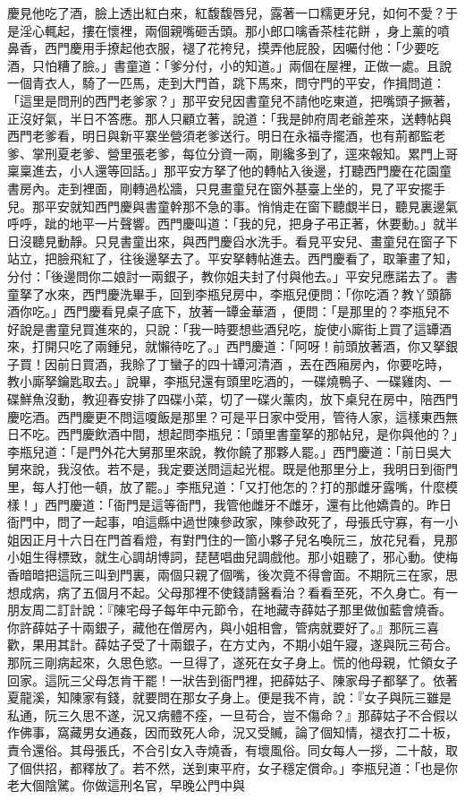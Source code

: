 慶見他吃了酒，臉上透出紅白來，紅馥馥唇兒，露著一口糯更牙兒，如何不愛？于是淫心輒起，摟在懷裡，兩個親嘴砸舌頭。那小郎口噙香茶桂花餅 ，身上薰的噴鼻香，西門慶用手撩起他衣服，褪了花袴兒，摸弄他屁股，因囑付他：「少要吃酒，只怕糟了臉。」書童道：「爹分付，小的知道。」兩個在屋裡，正做一處。且說一個青衣人，騎了一匹馬，走到大門首，跳下馬來，問守門的平安，作揖問道：「這里是問刑的西門老爹家？」那平安兒因書童兒不請他吃東道，把嘴頭子撅著，正沒好氣，半日不答應。那人只顧立著，說道：「我是帥府周老爺差來，送轉帖與西門老爹看，明日與新平寨坐營須老爹送行。明日在永福寺擺酒，也有荊都監老爹、掌刑夏老爹、營里張老爹，每位分資一兩，剛纔多到了，逕來報知。累門上哥稟稟進去，小人還等回話。」那平安方拏了他的轉帖入後邊，打聽西門慶在花園童書房內。走到裡面，剛轉過松牆，只見畫童兒在窗外基臺上坐的，見了平安擺手兒。那平安就知西門慶與書童幹那不急的事。悄悄走在窗下聽覷半日，聽見裏邊氣呼呼，跐的地平一片聲響。西門慶叫道：「我的兒，把身子弔正著，休要動。」就半日沒聽見動靜。只見書童出來，與西門慶舀水洗手。看見平安兒、畫童兒在窗子下站立，把臉飛紅了，往後邊拏去了。平安拏轉帖進去。西門慶看了，取筆畫了知，分付：「後邊問你二娘討一兩銀子，教你姐夫封了付與他去。」平安兒應諾去了。書童拏了水來，西門慶洗畢手，回到李瓶兒房中，李瓶兒便問：「你吃酒？教丫頭篩酒你吃。」西門慶看見桌子底下，放著一罈金華酒 ，便問：「是那里的？李瓶兒不好說是書童兒買進來的，只說：「我一時要想些酒兒吃，旋使小廝街上買了這罈酒來，打開只吃了兩鍾兒，就懶待吃了。」西門慶道：「阿呀！前頭放著酒，你又拏銀子買！因前日買酒，我賒了丁蠻子的四十罈河清酒 ，丟在西廂房內，你要吃時，教小廝拏鑰匙取去。」說畢，李瓶兒還有頭里吃酒的，一碟燒鴨子、一碟雞肉、一碟鮮魚沒動，教迎春安排了四碟小菜，切了一碟火薰肉，放下桌兒在房中，陪西門慶吃酒。西門慶更不問這嗄飯是那里？可是平日家中受用，管待人家，這樣東西無日不吃。西門慶飲酒中間，想起問李瓶兒：「頭里書童拏的那帖兒，是你與他的？」李瓶兒道：「是門外花大舅那里來說，教你饒了那夥人罷。」西門慶道：「前日吳大舅來說，我沒依。若不是，我定要送問這起光棍。既是他那里分上，我明日到衙門里，每人打他一頓，放了罷。」李瓶兒道：「又打他怎的？打的那雌牙露嘴，什麼模樣！」西門慶道：「衙門是這等衙門，我管他雌牙不雌牙，還有比他嬌貴的。昨日衙門中，問了一起事，咱這縣中過世陳參政家，陳參政死了，母張氏守寡，有一小姐因正月十六日在門首看燈，有對門住的一箇小夥子兒名喚阮三，放花兒看，見那小姐生得標致，就生心調胡博詞，琵琶唱曲兒調戲他。那小姐聽了，邪心動。使梅香暗暗把這阮三叫到門裏，兩個只親了個嘴，後次竟不得會面。不期阮三在家，思想成病，病了五個月不起。父母那裡不使錢請醫看治？看看至死，不久身亡。有一朋友周二訂計說：『陳宅母子每年中元節令，在地藏寺薛姑子那里做伽藍會燒香。你許薛姑子十兩銀子，藏他在僧房內，與小姐相會，管病就要好了。』那阮三喜歡，果用其計。薛姑子受了十兩銀子，在方丈內，不期小姐午寢，遂與阮三苟合。那阮三剛病起來，久思色慾。一旦得了，遂死在女子身上。慌的他母親，忙領女子回家。這阮三父母怎肯干罷！一狀告到衙門裡，把薛姑子、陳家母子都拏了。依著夏龍溪，知陳家有錢，就要問在那女子身上。便是我不肯，說：『女子與阮三雖是私通，阮三久思不遂，況又病體不痊，一旦苟合，豈不傷命？』那薛姑子不合假以作佛事，窩藏男女通姦，因而致死人命，況又受贓，論了個知情，褪衣打二十板，責令還俗。其母張氏，不合引女入寺燒香，有壞風俗。同女每人一拶，二十敲，取了個供招，都釋放了。若不然，送到東平府，女子穩定償命。」李瓶兒道：「也是你老大個陰騭。你做這刑名官，早晚公門中與